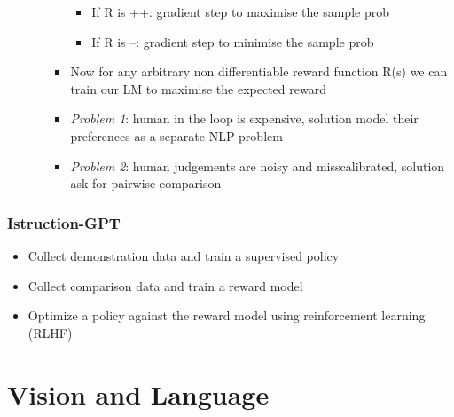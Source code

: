 \begin{itemize}
\begin{itemize}
\begin{itemize}
            \begin{itemize}
                \item If R is ++: gradient step to maximise the sample prob
                \item If R is --: gradient step to minimise the sample prob
            \end{itemize}
            \item Now for any arbitrary non differentiable reward function R(s) we can train our LM to maximise the expected reward
            \item \textit{Problem 1}: human in the loop is expensive, solution model their preferences as a separate NLP problem
            \item \textit{Problem 2}: human judgements are noisy and misscalibrated, solution ask for pairwise comparison
        \end{itemize}
    \end{itemize}
\end{itemize}
\subsection{Istruction-GPT}
\begin{itemize}
    \item Collect demonstration data and train a supervised policy
    \item Collect comparison data and train a reward model
    \item Optimize a policy against the reward model using reinforcement learning (RLHF)
\end{itemize}



\chapter{Vision and Language}
